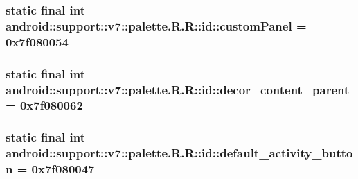 \hypertarget{classandroid_1_1support_1_1v7_1_1palette_1_1_r_1_1id_a5f6a31cd34a7538bb68d38477f9a94a}{
\subsubsection[{customPanel}]{\setlength{\rightskip}{0pt plus 5cm}static final int android::support::v7::palette.R.R::id::customPanel = 0x7f080054}}
\label{classandroid_1_1support_1_1v7_1_1palette_1_1_r_1_1id_a5f6a31cd34a7538bb68d38477f9a94a}


\hypertarget{classandroid_1_1support_1_1v7_1_1palette_1_1_r_1_1id_c3b393d7213d4e04bf44ea12f56175af}{
\subsubsection[{decor\_\-content\_\-parent}]{\setlength{\rightskip}{0pt plus 5cm}static final int android::support::v7::palette.R.R::id::decor\_\-content\_\-parent = 0x7f080062}}
\label{classandroid_1_1support_1_1v7_1_1palette_1_1_r_1_1id_c3b393d7213d4e04bf44ea12f56175af}


\hypertarget{classandroid_1_1support_1_1v7_1_1palette_1_1_r_1_1id_89b66fa46037d97127061eba497a5749}{
\subsubsection[{default\_\-activity\_\-button}]{\setlength{\rightskip}{0pt plus 5cm}static final int android::support::v7::palette.R.R::id::default\_\-activity\_\-button = 0x7f080047}}
\label{classandroid_1_1support_1_1v7_1_1palette_1_1_r_1_1id_89b66fa46037d97127061eba497a5749}


